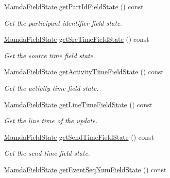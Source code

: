 \begin{CompactItemize}
\hyperlink{namespaceWombat_93aac974f2ab713554fd12a1fa3b7d2a}{Mamda\-Field\-State} \hyperlink{classWombat_1_1MamdaAuctionListener_9c0f690606ab4ec265fc97235e90c93d}{get\-Part\-Id\-Field\-State} () const 
\begin{CompactList}\small\item\em Get the participant identifier field state. \item\end{CompactList}\item 
\hyperlink{namespaceWombat_93aac974f2ab713554fd12a1fa3b7d2a}{Mamda\-Field\-State} \hyperlink{classWombat_1_1MamdaAuctionListener_147fd8bbd8cdd66a644d84146e9fda34}{get\-Src\-Time\-Field\-State} () const 
\begin{CompactList}\small\item\em Get the source time field state. \item\end{CompactList}\item 
\hyperlink{namespaceWombat_93aac974f2ab713554fd12a1fa3b7d2a}{Mamda\-Field\-State} \hyperlink{classWombat_1_1MamdaAuctionListener_f45aaa5aebbae7e326da900ea11c8422}{get\-Activity\-Time\-Field\-State} () const 
\begin{CompactList}\small\item\em Get the activity time field state. \item\end{CompactList}\item 
\hyperlink{namespaceWombat_93aac974f2ab713554fd12a1fa3b7d2a}{Mamda\-Field\-State} \hyperlink{classWombat_1_1MamdaAuctionListener_c73a0f3c19ad3a9106925e6fa89599ef}{get\-Line\-Time\-Field\-State} () const 
\begin{CompactList}\small\item\em Get the line time of the update. \item\end{CompactList}\item 
\hyperlink{namespaceWombat_93aac974f2ab713554fd12a1fa3b7d2a}{Mamda\-Field\-State} \hyperlink{classWombat_1_1MamdaAuctionListener_721c4b24c7a188038665f28fc03e45c2}{get\-Send\-Time\-Field\-State} () const 
\begin{CompactList}\small\item\em Get the send time field state. \item\end{CompactList}\item 
\hyperlink{namespaceWombat_93aac974f2ab713554fd12a1fa3b7d2a}{Mamda\-Field\-State} \hyperlink{classWombat_1_1MamdaAuctionListener_2438446343ae500da094c67160f39b66}{get\-Event\-Seq\-Num\-Field\-State} () const 

\end{CompactItemize}
